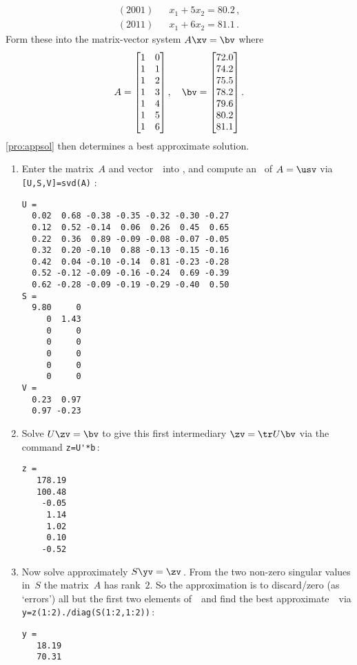 \begin{example}
\begin{solution}
\begin{eqnarray*}
\\(2001)&&x_1+5x_2=80.2\,,
\\(2011)&&x_1+6x_2=81.1\,.
\end{eqnarray*}
Form these into the matrix-vector system \(A\xv=\bv\) where
\begin{equation*}
A= \begin{bmatrix} 1&0\\1&1\\1&2\\1&3\\1&4\\1&5\\1&6 \end{bmatrix},
\quad \bv=\begin{bmatrix}72.0\\74.2\\75.5\\78.2\\79.6\\80.2\\81.1\end{bmatrix}.
\end{equation*}
\autoref{pro:appsol} then determines a best approximate solution.
\begin{enumerate}
\item Enter the matrix~\(A\) and vector~\bv\ into \script, and compute an \svd\ of \(A=\usv\) via \verb|[U,S,V]=svd(A)| \twodp:
\setbox\ajrqrbox\hbox{}%
\marginpar{\usebox{\ajrqrbox\\[2ex]}}%
\begin{verbatim}
U =
  0.02  0.68 -0.38 -0.35 -0.32 -0.30 -0.27
  0.12  0.52 -0.14  0.06  0.26  0.45  0.65
  0.22  0.36  0.89 -0.09 -0.08 -0.07 -0.05
  0.32  0.20 -0.10  0.88 -0.13 -0.15 -0.16
  0.42  0.04 -0.10 -0.14  0.81 -0.23 -0.28
  0.52 -0.12 -0.09 -0.16 -0.24  0.69 -0.39
  0.62 -0.28 -0.09 -0.19 -0.29 -0.40  0.50
S =
  9.80     0
     0  1.43
     0     0
     0     0
     0     0
     0     0
     0     0
V =
  0.23  0.97
  0.97 -0.23
\end{verbatim}
\item Solve \(U\zv=\bv\) to give this first intermediary \(\zv=\tr U\bv\) via the command \verb|z=U'*b|\,:
\begin{verbatim}
z =
   178.19
   100.48
    -0.05
     1.14
     1.02
     0.10
    -0.52
\end{verbatim}

\item Now solve approximately \(S\yv=\zv\)\,. 
From the two non-zero singular values in~\(S\) the matrix~\(A\) has rank~\(2\).
So the approximation is to discard\slash zero (as `errors') all but the first two elements of~\zv\ and find the best approximate~\yv\ via \verb|y=z(1:2)./diag(S(1:2,1:2))|\,:
\begin{verbatim}
y =
   18.19
   70.31
\end{verbatim}


\end{enumerate}
\end{solution}
\end{example}
